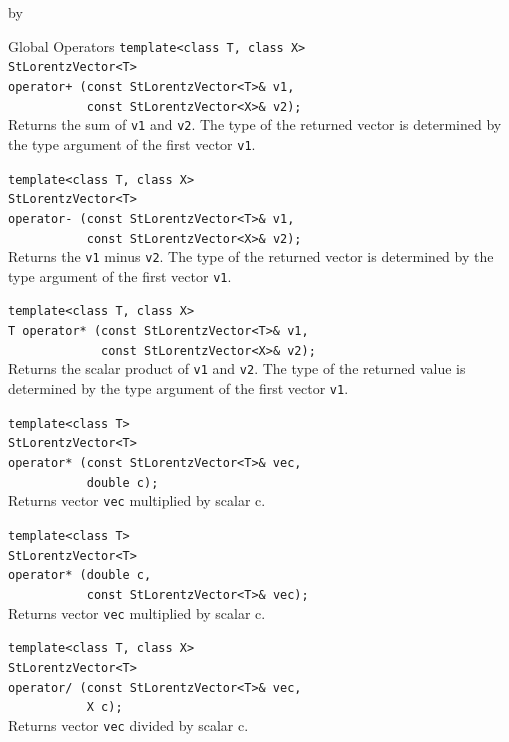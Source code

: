 \documentclass[twoside]{article}
\newcommand{\comp}[1]{\texttt{#1}}%
\newcommand{\entrylabel}[1]{\mbox{\textbf{{#1}}}\hfil}%
\newenvironment{entry}
{\begin{list}{}%
    {\renewcommand{\makelabel}{\entrylabel}%
     \setlength{\labelwidth}{90pt}%
     \setlength{\leftmargin}{\labelwidth}
     \advance\leftmargin by \labelsep%
      }%
    }%
  {\end{list}}
\newcommand{\Entrylabel}[1]%
{\raisebox{0pt}[1ex][0pt]{\makebox[\labelwidth][l]%
    {\parbox[t]{\labelwidth}{\hspace{0pt}\textbf{{#1}}}}}}
\newenvironment{Entry}%
{\renewcommand{\entrylabel}{\Entrylabel}\begin{entry}}%
  {\end{entry}}
\begin{document}
\begin{description}
\begin{Entry}
\item[Global Operators]
    \verb+template<class T, class X>+\\
    \verb+StLorentzVector<T>+\\
    \verb#operator+ (const StLorentzVector<T>& v1,#\\
    \verb+           const StLorentzVector<X>& v2);+\\
    Returns the sum of \comp{v1} and \comp{v2}.
    The type of the returned vector is determined by the type
    argument of the first vector \comp{v1}.
    
    \verb+template<class T, class X>+\\
    \verb+StLorentzVector<T>+\\
    \verb+operator- (const StLorentzVector<T>& v1,+\\
    \verb+           const StLorentzVector<X>& v2);+\\
    Returns the \comp{v1} minus \comp{v2}.
    The type of the returned vector is determined by the type
    argument of the first vector \comp{v1}.
     
    \verb+template<class T, class X>+\\
    \verb+T operator* (const StLorentzVector<T>& v1,+\\
    \verb+             const StLorentzVector<X>& v2);+\\
    Returns the scalar product of \comp{v1} and \comp{v2}.
    The type of the returned value is determined by the type
    argument of the first vector \comp{v1}.
    
    \verb+template<class T>+\\
    \verb+StLorentzVector<T>+\\
    \verb+operator* (const StLorentzVector<T>& vec,+\\
    \verb+           double c);+\\
    Returns vector \comp{vec} multiplied by scalar c.
    
    \verb+template<class T>+\\
    \verb+StLorentzVector<T>+\\
    \verb+operator* (double c,+\\
    \verb+           const StLorentzVector<T>& vec);+\\
    Returns vector \comp{vec} multiplied by scalar c.
    
    \verb+template<class T, class X>+\\
    \verb+StLorentzVector<T>+\\
    \verb+operator/ (const StLorentzVector<T>& vec,+\\
    \verb+           X c);+\\
    Returns vector \comp{vec} divided by scalar c.


\end{Entry}
\end{description}
\end{document}
